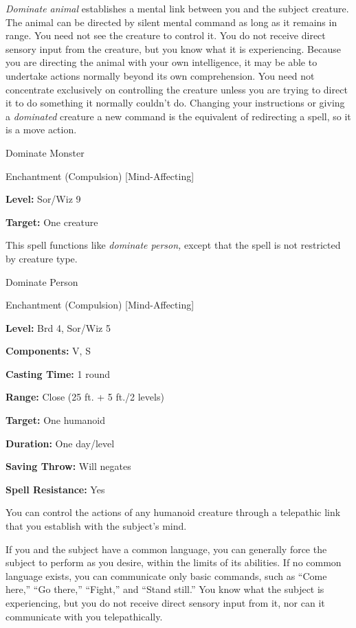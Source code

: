 \documentclass{article}
\begin{document}
\textit{Dominate animal }establishes a mental link between you and the subject 
creature. The animal can be directed by silent mental command as long as it remains 
in range. You need not see the creature to control it. You do not receive direct 
sensory input from the creature, but you know what it is experiencing. Because 
you are directing the animal with your own intelligence, it may be able to undertake 
actions normally beyond its own comprehension. You need not concentrate exclusively 
on controlling the creature unless you are trying to direct it to do something 
it normally couldn't do. Changing your instructions or giving a \textit{dominated 
}creature a new command is the equivalent of redirecting a spell, so it is a move 
action.

\vspace{12pt}
Dominate Monster

Enchantment (Compulsion) [Mind-Affecting]

\textbf{Level:} Sor/Wiz 9

\textbf{Target:} One creature

This spell functions like \textit{dominate person, }except that the spell is not 
restricted by creature type.

\vspace{12pt}
Dominate Person

Enchantment (Compulsion) [Mind-Affecting]

\textbf{Level:} Brd 4, Sor/Wiz 5

\textbf{Components:} V, S

\textbf{Casting Time:} 1 round

\textbf{Range:} Close (25 ft. + 5 ft./2 levels)

\textbf{Target:} One humanoid

\textbf{Duration:} One day/level

\textbf{Saving Throw: }Will negates

\textbf{Spell Resistance:} Yes

You can control the actions of any humanoid creature through a telepathic link 
that you establish with the subject's mind.

If you and the subject have a common language, you can generally force the subject 
to perform as you desire, within the limits of its abilities. If no common language 
exists, you can communicate only basic commands, such as ``Come here,'' ``Go there,'' 
``Fight,'' and ``Stand still.'' You know what the subject is experiencing, but 
you do not receive direct sensory input from it, nor can it communicate with you 
telepathically.
\end{document}
